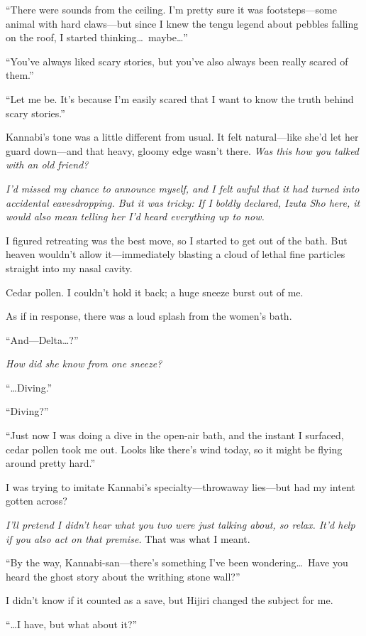 \documentclass[
    a4paper,
    12pt,
    twoside,
    openany,
    UTF8,
    fontset=windows
]{ctexbook}
\begin{document}
``There were sounds from the ceiling. I'm pretty sure it was footsteps---some animal with hard claws---but since I knew the tengu legend about pebbles falling on the roof, I started thinking\dots\ maybe\dots''

``You've always liked scary stories, but you've also always been really scared of them.''

``Let me be. It's because I'm easily scared that I want to know the truth behind scary stories.''

Kannabi's tone was a little different from usual. It felt natural---like she'd let her guard down---and that heavy, gloomy edge wasn't there. \textit{Was this how you talked with an old friend?}

\textit{I'd missed my chance to announce myself, and I felt awful that it had turned into accidental eavesdropping. But it was tricky: If I boldly declared, Izuta Sho here, it would also mean telling her I'd heard everything up to now.}

I figured retreating was the best move, so I started to get out of the bath. But heaven wouldn't allow it---immediately blasting a cloud of lethal fine particles straight into my nasal cavity.

Cedar pollen. I couldn't hold it back; a huge sneeze burst out of me.

As if in response, there was a loud splash from the women's bath.

``And---Delta\dots?''

\textit{How did she know from one sneeze?}

``\dots Diving.''

``Diving?''

``Just now I was doing a dive in the open-air bath, and the instant I surfaced, cedar pollen took me out. Looks like there's wind today, so it might be flying around pretty hard.''

I was trying to imitate Kannabi's specialty---throwaway lies---but had my intent gotten across?

\textit{I'll pretend I didn't hear what you two were just talking about, so relax. It'd help if you also act on that premise.} That was what I meant.

``By the way, Kannabi-san---there's something I've been wondering\dots\ Have you heard the ghost story about the writhing stone wall?''

I didn't know if it counted as a save, but Hijiri changed the subject for me.

``\dots I have, but what about it?''
\end{document}
